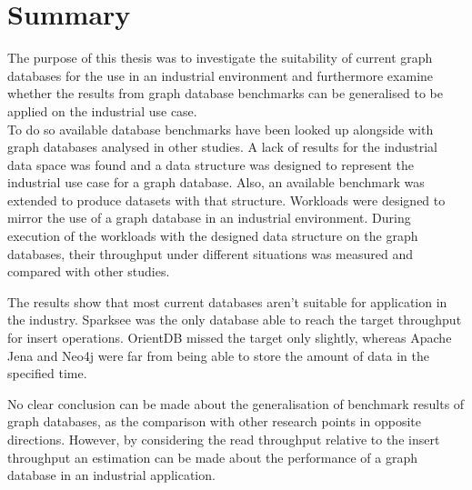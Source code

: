 \section{Summary}
The purpose of this thesis was to investigate the suitability of current graph databases for the use in an industrial environment and furthermore examine whether the results from graph database benchmarks can be generalised to be applied on the industrial use case.\\
To do so available database benchmarks have been looked up alongside with graph databases analysed in other studies.
A lack of results for the industrial data space was found and a data structure was designed to represent the industrial use case for a graph database.
Also,
an available benchmark was extended to produce datasets with that structure.
Workloads were designed to mirror the use of a graph database in an industrial environment.
During execution of the workloads with the designed data structure on the graph databases,
their throughput under different situations was measured and compared with other studies.

The results show that most current databases aren't suitable for application in the industry.
Sparksee was the only database able to reach the target throughput for insert operations.
OrientDB missed the target only slightly,
whereas Apache Jena and Neo4j were far from being able to store the amount of data in the specified time.

No clear conclusion can be made about the generalisation of benchmark results of graph databases,
as the comparison with other research points in opposite directions.
However,
by considering the read throughput relative to the insert throughput an estimation can be made about the performance of a graph database in an industrial application.
